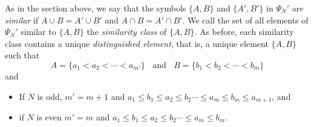 \documentclass[reqno,11pt]{amsart}
\theoremstyle{remark}
\theoremstyle{remark}
\theoremstyle{definition}
\theoremstyle{definition}
\theoremstyle{definition}
\numberwithin{equation}{section}
\begin{document}
As in the section above, we say that the symbols $\{A,B\}$ and $\{A',B'\}$ in $\Psi_N'$ are \emph{similar} if $A\cup B = A'\cup B'$ and $A\cap B = A'\cap B'$. We call the set of all elements of $\Psi_N'$ similar to $\{A,B\}$ the \emph{similarity class} of $\{A,B\}$.  As before, each similarity class contains a unique \emph{distinguished element}, that is, a unique element $\{A,B\}$ such that 
\[
A=\{a_1<a_2<\cdots < a_{m'}\} \;\; \text{ and } \;\; B = \{b_1<b_2<\cdots <b_m\}
\]
and 
\begin{itemize}
\item If $N$ is odd, $m'=m+1$ and $a_1\leq b_1\leq a_2\leq b_2 \cdots \leq a_m \leq b_m \leq a_{m+1}$, and 
\item if $N$ is even $m'=m$ and $a_1\leq b_1\leq a_2\leq b_2 \cdots \leq a_m \leq b_m$.
\end{itemize}
\end{document}
